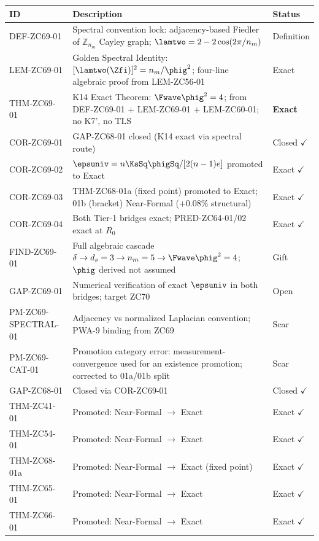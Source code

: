 \documentclass[12pt, a4paper]{article}
\begin{document}
\bigskip
\begin{formalbox}[title={Atomic Registry --- ZC69}]
\begin{center}
\renewcommand{\arraystretch}{1.3}
\small
\begin{tabular}{lp{7.3cm}l}
\toprule
ID & Description & Status \\
\midrule
DEF-ZC69-01
  & Spectral convention lock: adjacency-based Fiedler of
    $\mathbb{Z}_{n_m}$ Cayley graph; $\lamtwo = 2-2\cos(2\pi/n_m)$
  & Definition \\[3pt]
LEM-ZC69-01
  & Golden Spectral Identity: $[\lamtwo(\Zfi)]^2 = n_m/\phig^2$;
    four-line algebraic proof from LEM-ZC56-01
  & Exact \\[3pt]
THM-ZC69-01
  & K14 Exact Theorem: $\Fwave\phig^2 = 4$;
    from DEF-ZC69-01 + LEM-ZC69-01 + LEM-ZC60-01;
    no K7', no TLS
  & \textbf{Exact} \\[3pt]
COR-ZC69-01
  & GAP-ZC68-01 closed (K14 exact via spectral route)
  & Closed $\checkmark$ \\[3pt]
COR-ZC69-02
  & $\epsuniv = n\KsSq\phigSq/[2(n-1)e]$ promoted to Exact
  & Exact $\checkmark$ \\[3pt]
COR-ZC69-03
  & THM-ZC68-01a (fixed point) promoted to Exact;
    01b (bracket) Near-Formal ($+0.08\%$ structural)
  & Exact $\checkmark$ \\[3pt]
COR-ZC69-04
  & Both Tier-1 bridges exact; PRED-ZC64-01/02 exact at $R_0$
  & Exact $\checkmark$ \\[3pt]
FIND-ZC69-01
  & Full algebraic cascade $\delta \to d_s=3 \to n_m=5 \to
    \Fwave\phig^2=4$; $\phig$ derived not assumed
  & Gift \\[3pt]
GAP-ZC69-01
  & Numerical verification of exact $\epsuniv$ in both bridges;
    target ZC70
  & Open \\[3pt]
PM-ZC69-SPECTRAL-01
  & Adjacency vs normalized Laplacian convention;
    PWA-9 binding from ZC69
  & Scar \\[3pt]
PM-ZC69-CAT-01
  & Promotion category error: measurement-convergence used for an
    existence promotion; corrected to 01a/01b split
  & Scar \\
\midrule
GAP-ZC68-01  & Closed via COR-ZC69-01     & Closed $\checkmark$ \\
THM-ZC41-01  & Promoted: Near-Formal $\to$ Exact & Exact $\checkmark$ \\
THM-ZC54-01  & Promoted: Near-Formal $\to$ Exact & Exact $\checkmark$ \\
THM-ZC68-01a & Promoted: Near-Formal $\to$ Exact (fixed point) & Exact $\checkmark$ \\
THM-ZC65-01  & Promoted: Near-Formal $\to$ Exact & Exact $\checkmark$ \\
THM-ZC66-01  & Promoted: Near-Formal $\to$ Exact & Exact $\checkmark$ \\
\bottomrule
\end{tabular}
\end{center}
\end{formalbox}
\end{document}
